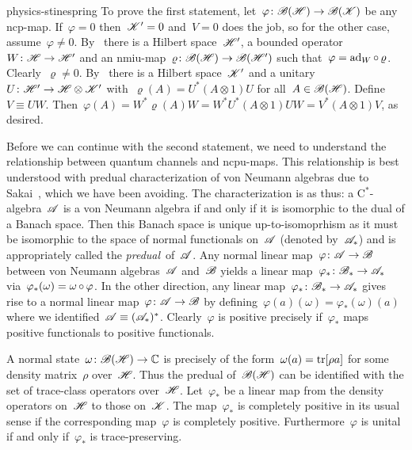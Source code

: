 \label{sols}
\begin{solution}{physics-stinespring}%
To prove the first statement,
let~$\varphi \colon \mathscr{B}(\mathscr{H}) \to \mathscr{B}(\mathscr{K})$ be any ncp-map.
If~$\varphi=0$ then~$\mathscr{K}'=0$ and~$V=0$ does the job,
        so for the other case, assume~$\varphi \neq 0$.
    By~
        there is a Hilbert space~$\mathscr{H}'$,
        a bounded operator~$W \colon \mathscr{H} \to \mathscr{H}'$ and an
        nmiu-map~$\varrho \colon \mathscr{B}(\mathscr{H}) \to \mathscr{B}(\mathscr{H}')$
        such that~$\varphi = \mathrm{ad}_W \mathop{\circ} \varrho$.
Clearly~$\varrho \neq 0$.
    By~
        there is a Hilbert space~$\mathscr{K}'$
        and a unitary~$U \colon \mathscr{H}' \to \mathscr{H} \otimes \mathscr{K}'$
        with~$\varrho(A) = U^* (A \otimes 1) U$
         for all~$A \in \mathscr{B}(\mathscr{H})$.
Define~$V \equiv UW$.
    Then~$\varphi(A) = W^* \varrho(A) W = W^*U^* (A \otimes 1) UW
        =  V^* (A \otimes 1 ) V$, as desired.

Before we can continue with the second statement,
    we need to understand the relationship
    between quantum channels and ncpu-maps.
This relationship is best understood with
    predual characterization of von Neumann algebras
    due to Sakai~\cite{sakai}, which we have been avoiding.
The characterization is as thus:
    a C$^*$-algebra~$\mathscr{A}$ is a von Neumann algebra
    if and only if it is isomorphic to the dual of a Banach space.
Then this Banach space is unique up-to-isomoprhism
    as it must be isomorphic to the space of normal functionals on~$\mathscr{A}$
    (denoted by~$\mathscr{A}_*$)
    and is appropriately called the \emph{predual}~of~$\mathscr{A}$.
Any normal linear map~$\varphi\colon \mathscr{A} \to \mathscr{B}$
    between von Neumann algebras~$\mathscr{A}$ and~$\mathscr{B}$
    yields a linear map~$\varphi_*\colon \mathscr{B}_* \to \mathscr{A}_*$
    via~$\varphi_*(\omega) = \omega \mathop{\circ} \varphi$.
In the other direction, any linear map~$\varphi_* \colon \mathscr{B}_* \to \mathscr{A}_*$
    gives rise to a normal linear map~$\varphi\colon \mathscr{A} \to \mathscr{B}$
    by defining~$\varphi(a)(\omega) = \varphi_*(\omega)(a)$
    where we identified~$\mathscr{A} \equiv (\mathscr{A}_*)^*$.
Clearly~$\varphi$ is positive precisely
    if~$\varphi_*$ maps positive functionals to positive functionals.

A normal state~$\omega\colon \mathscr{B}(\mathscr{H}) \to \mathbb{C}$
    is precisely of the form~$\omega(a) = \mathop{\mathrm{tr}}[\rho a]$ for some density
        matrix~$\rho$ over~$\mathscr{H}$.
Thus the predual of~$\mathscr{B}(\mathscr{H})$ can be identified
    with the set of trace-class operators over~$\mathscr{H}$.
Let~$\varphi_*$ be a linear map from the density operators
    on~$\mathscr{H}$ to those on~$\mathscr{K}$.
The map~$\varphi_*$ is completely positive in its usual sense
    if the corresponding map~$\varphi$ is completely positive.
Furthermore~$\varphi$ is unital if and only if~$\varphi_*$
    is trace-preserving.


\end{solution}
